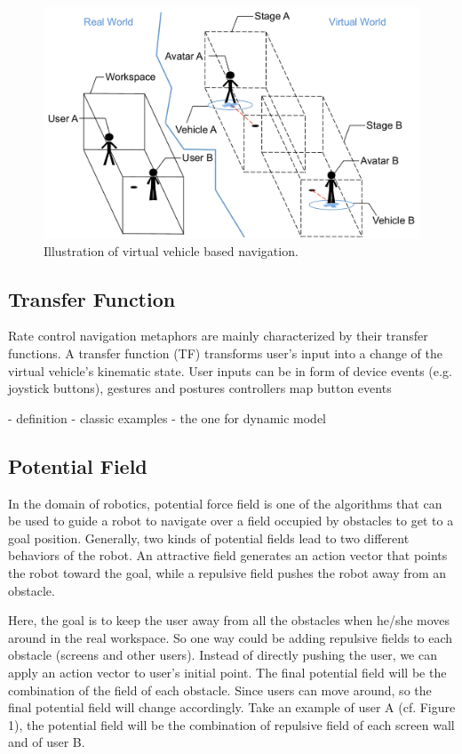 \begin{figure}[htb]
  \centering
  \includegraphics[width=.9\textwidth]{figures/ch5/multi_vehicle}
  \caption{\label{fig:5_multi_vehicle}Illustration of virtual vehicle based navigation.}
\end{figure}


\subsection{Transfer Function}
Rate control navigation metaphors are mainly characterized by their transfer functions. A transfer function (TF) transforms user's input into a change of the virtual vehicle's kinematic state. User inputs can be in form of device events (e.g. joystick buttons), gestures and postures controllers map button events  

- definition
- classic examples
- the one for dynamic model


\subsection{Potential Field}
In the domain of robotics, potential force field is one of the algorithms that can be used to guide a robot to navigate over a field occupied by obstacles to get to a goal position. Generally, two kinds of potential fields lead to two different behaviors of the robot. An attractive field generates an action vector that points the robot toward the goal, while a repulsive field pushes the robot away from an obstacle.

Here, the goal is to keep the user away from all the obstacles when he/she moves around in the real workspace. So one way could be adding repulsive fields to each obstacle (screens and other users). Instead of directly pushing the user, we can apply an action vector to user's initial point. The final potential field will be the combination of the field of each obstacle. Since users can move around, so the final potential field will change accordingly. Take an example of user A (cf. Figure 1), the potential field will be the combination of repulsive field of each screen wall and of user B.

